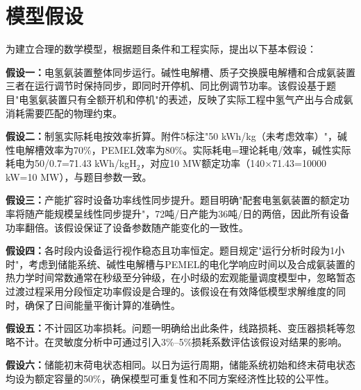 \section{模型假设}

为建立合理的数学模型，根据题目条件和工程实际，提出以下基本假设：

\textbf{假设一：}电氢氨装置整体同步运行。碱性电解槽、质子交换膜电解槽和合成氨装置三者在运行调节时保持同步，即同时开停机、同比例调节功率。该假设基于题目"电氢氨装置只有全额开机和停机"的表述，反映了实际工程中氢气产出与合成氨消耗需要匹配的物理约束。

\textbf{假设二：}制氢实际耗电按效率折算。附件5标注"50 kWh/kg（未考虑效率）"，碱性电解槽效率为70\%，PEMEL效率为80\%。实际耗电=理论耗电/效率，碱性实际耗电为50/0.7=71.43 kWh/kgH$_2$，对应10 MW额定功率（140$\times$71.43=10000 kW=10 MW），与题目参数一致。

\textbf{假设三：}产能扩容时设备功率线性同步提升。题目明确"配套电氢氨装置的额定功率将随产能规模呈线性同步提升"，72吨/日产能为36吨/日的两倍，因此所有设备功率翻倍。该假设保证了设备参数随产能变化的一致性。

\textbf{假设四：}各时段内设备运行视作稳态且功率恒定。题目规定"运行分析时段为1小时"，考虑到储能系统、碱性电解槽与PEMEL的电化学响应时间以及合成氨装置的热力学时间常数通常在秒级至分钟级，在小时级的宏观能量调度模型中，忽略暂态过渡过程采用分段恒定功率假设是合理的。该假设在有效降低模型求解维度的同时，确保了日间能量平衡计算的准确性。


\textbf{假设五：}不计园区功率损耗。问题一明确给出此条件，线路损耗、变压器损耗等忽略不计。在灵敏度分析中可通过引入3\%--5\%损耗系数评估该假设对结果的影响。

\textbf{假设六：}储能初末荷电状态相同。以日为运行周期，储能系统初始和终末荷电状态均设为额定容量的50\%，确保模型可重复性和不同方案经济性比较的公平性。
